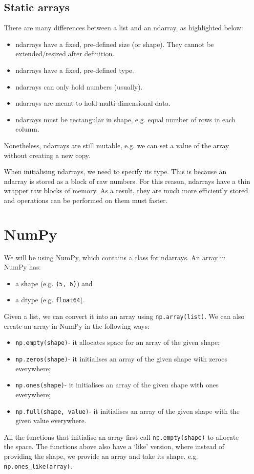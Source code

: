 \documentclass[a4paper, openany]{memoir}
\begin{document}
    \subsection{Static arrays}
    There are many differences between a list and an ndarray, as highlighted below:
    \begin{itemize}
        \item ndarrays have a fixed, pre-defined size (or shape). They cannot be extended/resized after definition.
        \item ndarrays have a fixed, pre-defined type.
        \item ndarrays can only hold numbers (usually).
        \item ndarrays are meant to hold multi-dimensional data.
        \item ndarrays must be rectangular in shape, e.g. equal number of rows in each column.
    \end{itemize}
    Nonetheless, ndarrays are still mutable, e.g. we can set a value of the array without creating a new copy.

    When initialising ndarrays, we need to specify its type. This is because an ndarray is stored as a block of raw numbers. For this reason, ndarrays have a thin wrapper raw blocks of memory. As a result, they are much more efficiently stored and operations can be performed on them must faster.
    \newpage

    \section{NumPy}
    We will be using NumPy, which contains a class for ndarrays. An array in NumPy has:
    \begin{itemize}
        \item a shape (e.g. \texttt{(5, 6)}) and
        \item a dtype (e.g. \texttt{float64}).
    \end{itemize}

    Given a list, we can convert it into an array using \texttt{np.array(list)}. We can also create an array in NumPy in the following ways:
    \begin{itemize}
        \item \texttt{np.empty(shape)}- it allocates space for an array of the given shape;
        \item \texttt{np.zeros(shape)}- it initialises an array of the given shape with zeroes everywhere;
        \item \texttt{np.ones(shape)}- it initialises an array of the given shape with ones everywhere;
        \item \texttt{np.full(shape, value)}- it initialises an array of the given shape with the given value everywhere.
    \end{itemize}
    All the functions that initialise an array first call \texttt{np.empty(shape)} to allocate the space. The functions above also have a `like' version, where instead of providing the shape, we provide an array and take its shape, e.g. \texttt{np.ones\_like(array)}.
\end{document}
